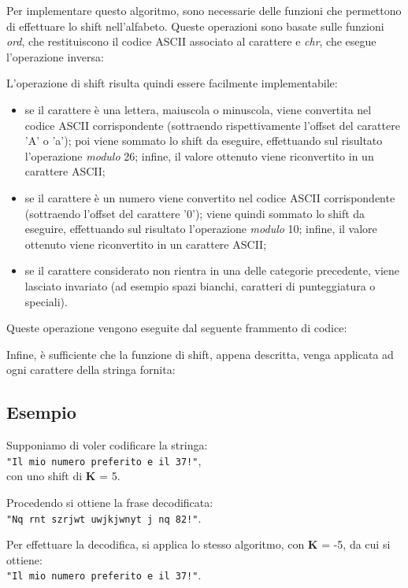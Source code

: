 Per implementare questo algoritmo, sono necessarie delle funzioni che permettono di effettuare lo shift nell'alfabeto. Queste operazioni sono basate sulle funzioni \textit{ord}, che restituiscono il codice ASCII associato al carattere e \textit{chr}, che esegue l'operazione inversa:


L'operazione di shift risulta quindi essere facilmente implementabile:
\begin{itemize}
	\item se il carattere è una lettera, maiuscola o minuscola, viene convertita nel codice ASCII corrispondente (sottraendo rispettivamente l'offset del carattere 'A' o 'a'); poi viene sommato lo shift da eseguire, effettuando sul risultato l'operazione \textit{modulo} 26; infine, il valore ottenuto viene riconvertito in un carattere ASCII;
	\item se il carattere è un numero viene convertito nel codice ASCII corrispondente (sottraendo l'offset del carattere '0'); viene quindi sommato lo shift da eseguire, effettuando sul risultato l'operazione \textit{modulo} 10; infine, il valore ottenuto viene riconvertito in un carattere ASCII;
	\item se il carattere considerato non rientra in una delle categorie precedente, viene lasciato invariato (ad esempio spazi bianchi, caratteri di punteggiatura o speciali).
\end{itemize}
Queste operazione vengono eseguite dal seguente frammento di codice:


Infine, è sufficiente che la funzione di shift, appena descritta, venga applicata ad ogni carattere della stringa fornita:


\subsection{Esempio}
Supponiamo di voler codificare la stringa: \\
\texttt{"Il mio numero preferito e il 37!"}, \\
con uno shift di \textbf{K} = 5.

Procedendo si ottiene la frase decodificata: \\
\texttt{"Nq rnt szrjwt uwjkjwnyt j nq 82!"}.

Per effettuare la decodifica, si applica lo stesso algoritmo, con \textbf{K} = -5, da cui si ottiene: \\
\texttt{"Il mio numero preferito e il 37!"}.

